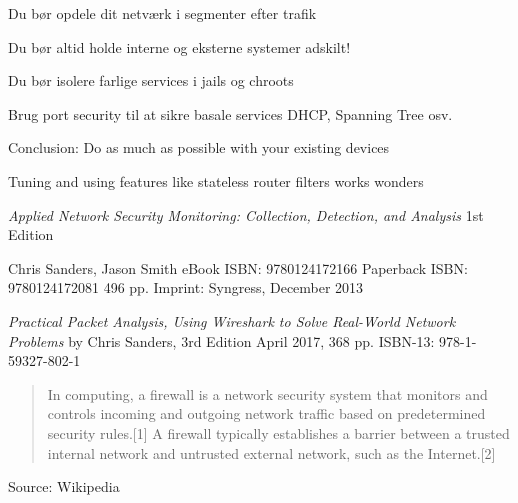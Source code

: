 \documentclass[Screen16to9,17pt]{foils}
\begin{document}


\begin{list1}
\item Du bør opdele dit netværk i segmenter efter trafik
\item Du bør altid holde interne og eksterne systemer adskilt!
\item Du bør isolere farlige services i jails og chroots
\item Brug port security til at sikre basale services DHCP, Spanning Tree osv.
\end{list1}





\begin{list1}
\item Conclusion: Do as much as possible with your existing devices
\item Tuning and using features like stateless router filters works wonders
\end{list1}



\emph{Applied Network Security Monitoring: Collection, Detection, and Analysis}
1st Edition

Chris Sanders, Jason Smith
eBook ISBN: 9780124172166
Paperback ISBN: 9780124172081 496 pp.
Imprint: Syngress, December 2013

{\footnotesize{}}


\emph{Practical Packet Analysis,
Using Wireshark to Solve Real-World Network Problems}
by Chris Sanders, 3rd Edition
April 2017, 368 pp.
ISBN-13:
978-1-59327-802-1






\begin{quote}
In computing, a firewall is a network security system that monitors and controls incoming and outgoing network traffic based on predetermined security rules.[1] A firewall typically establishes a barrier between a trusted internal network and untrusted external network, such as the Internet.[2]
\end{quote} Source: Wikipedia
\end{document}
